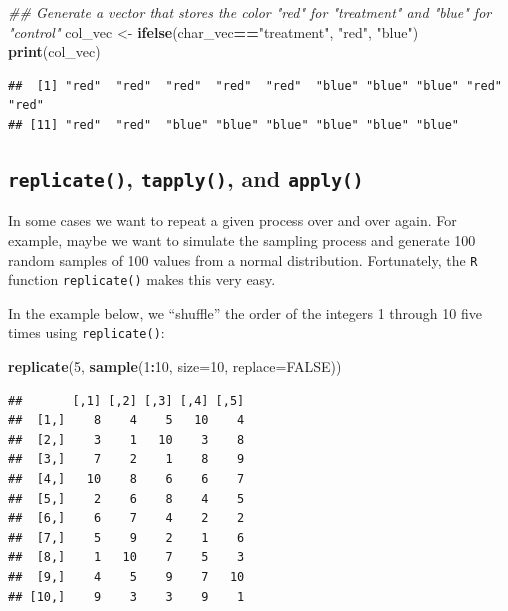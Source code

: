 \documentclass[]{book}
\newenvironment{Shaded}{\begin{snugshade}}{\end{snugshade}}
\newcommand{\CommentTok}[1]{\textcolor[rgb]{0.56,0.35,0.01}{\textit{#1}}}
\newcommand{\DataTypeTok}[1]{\textcolor[rgb]{0.13,0.29,0.53}{#1}}
\newcommand{\DecValTok}[1]{\textcolor[rgb]{0.00,0.00,0.81}{#1}}
\newcommand{\KeywordTok}[1]{\textcolor[rgb]{0.13,0.29,0.53}{\textbf{#1}}}
\newcommand{\NormalTok}[1]{#1}
\newcommand{\OperatorTok}[1]{\textcolor[rgb]{0.81,0.36,0.00}{\textbf{#1}}}
\newcommand{\OtherTok}[1]{\textcolor[rgb]{0.56,0.35,0.01}{#1}}
\newcommand{\StringTok}[1]{\textcolor[rgb]{0.31,0.60,0.02}{#1}}
\begin{document}
\begin{Shaded}
\begin{Highlighting}[]
\CommentTok{## Generate a vector that stores the color "red" for "treatment" and "blue" for "control"}
\NormalTok{col_vec <-}\StringTok{ }\KeywordTok{ifelse}\NormalTok{(char_vec}\OperatorTok{==}\StringTok{"treatment"}\NormalTok{, }\StringTok{"red"}\NormalTok{, }\StringTok{"blue"}\NormalTok{)}
\KeywordTok{print}\NormalTok{(col_vec)}
\end{Highlighting}
\end{Shaded}

\begin{verbatim}
##  [1] "red"  "red"  "red"  "red"  "red"  "blue" "blue" "blue" "red"  "red" 
## [11] "red"  "red"  "blue" "blue" "blue" "blue" "blue" "blue"
\end{verbatim}

\hypertarget{replicate-tapply-and-apply}{%
\subsection{\texorpdfstring{\texttt{replicate()}, \texttt{tapply()}, and \texttt{apply()}}{replicate(), tapply(), and apply()}}\label{replicate-tapply-and-apply}}

In some cases we want to repeat a given process over and over again. For example, maybe we want to simulate the sampling process and generate 100 random samples of 100 values from a normal distribution. Fortunately, the \texttt{R} function \texttt{replicate()} makes this very easy.

In the example below, we ``shuffle'' the order of the integers 1 through 10 five times using \texttt{replicate()}:

\begin{Shaded}
\begin{Highlighting}[]
\KeywordTok{replicate}\NormalTok{(}\DecValTok{5}\NormalTok{, }\KeywordTok{sample}\NormalTok{(}\DecValTok{1}\OperatorTok{:}\DecValTok{10}\NormalTok{, }\DataTypeTok{size=}\DecValTok{10}\NormalTok{, }\DataTypeTok{replace=}\OtherTok{FALSE}\NormalTok{))}
\end{Highlighting}
\end{Shaded}

\begin{verbatim}
##       [,1] [,2] [,3] [,4] [,5]
##  [1,]    8    4    5   10    4
##  [2,]    3    1   10    3    8
##  [3,]    7    2    1    8    9
##  [4,]   10    8    6    6    7
##  [5,]    2    6    8    4    5
##  [6,]    6    7    4    2    2
##  [7,]    5    9    2    1    6
##  [8,]    1   10    7    5    3
##  [9,]    4    5    9    7   10
## [10,]    9    3    3    9    1
\end{verbatim}
\end{document}
